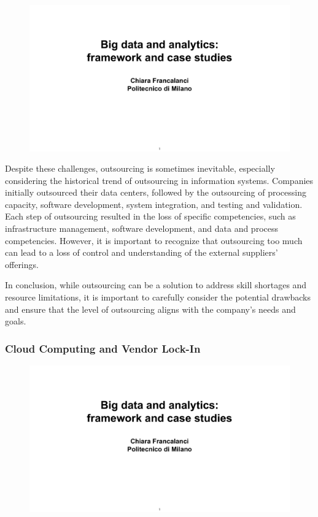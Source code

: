 \begin{figure}[!h]
  \centering
  \includegraphics[page=76, trim = 1cm 4cm 1.5cm 5cm, clip, width=\imagewidth]{images/06 - BIG_DATA.pdf}
\end{figure}

Despite these challenges, outsourcing is sometimes inevitable,
especially considering the historical trend of outsourcing in
information systems. Companies initially outsourced their data centers,
followed by the outsourcing of processing capacity, software
development, system integration, and testing and validation. Each step
of outsourcing resulted in the loss of specific competencies, such as
infrastructure management, software development, and data and process
competencies. However, it is important to recognize that outsourcing too
much can lead to a loss of control and understanding of the external
suppliers' offerings.

In conclusion, while outsourcing can be a solution to address skill
shortages and resource limitations, it is important to carefully
consider the potential drawbacks and ensure that the level of
outsourcing aligns with the company's needs and goals.

\subsubsection{Cloud Computing and Vendor Lock-In}

\begin{figure}[!h]
  \centering
  \includegraphics[page=83, trim = 1cm 1.5cm 1.5cm 3cm, clip, width=\imagewidth]{images/06 - BIG_DATA.pdf}
\end{figure}


